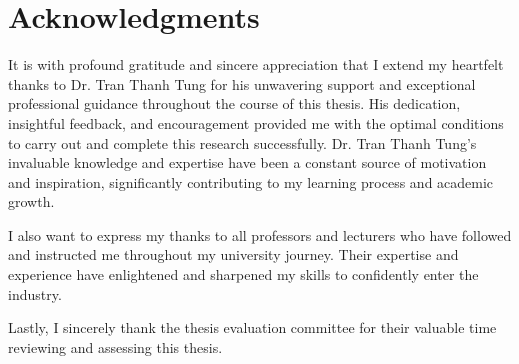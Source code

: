 \documentclass[12pt, twoside]{report}
\begin{document}
\begin{titlepage}
	\hspace{7cm}
	\makebox[7cm][l]{\underline{\hspace{7cm}}}
	\par \hspace{7cm}
	\par
	\vspace{2cm}
		
	\hspace{7cm}
	\makebox[7cm][l]{\underline{\hspace{7cm}}}
	\par \hspace{7cm}
	\par
	\vspace{0.75cm}
														
	\hspace{7cm}
	\par
	\thispagestyle{empty}
\end{titlepage}
\restoregeometry
	
\chapter*{Acknowledgments}
\hspace{1cm}It is with profound gratitude and sincere appreciation that I extend my heartfelt thanks to Dr. Tran Thanh Tung for his unwavering support and exceptional professional guidance throughout the course of this thesis. His dedication, insightful feedback, and encouragement provided me with the optimal conditions to carry out and complete this research successfully. Dr. Tran Thanh Tung's invaluable knowledge and expertise have been a constant source of motivation and inspiration, significantly contributing to my learning process and academic growth.

\hspace{0.5cm}I also want to express my thanks to all professors and lecturers who have followed and instructed me throughout my university journey. Their expertise and experience have enlightened and sharpened my skills to confidently enter the industry.

\hspace{0.5cm}Lastly, I sincerely thank the thesis evaluation committee for their valuable time reviewing and assessing this thesis.

\thispagestyle{empty}
\end{document}
